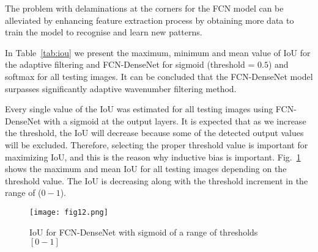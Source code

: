 The problem with delaminations at the corners for the FCN model can be alleviated by enhancing feature extraction process by obtaining more data to train the model to recognise and learn new patterns.

In Table~\ref{tab:iou} we present the maximum, minimum and mean value of IoU for the adaptive filtering and FCN-DenseNet for sigmoid (threshold = \(0.5\)) and softmax for all testing images.
It can be concluded that the FCN-DenseNet model surpasses significantly adaptive wavenumber filtering method. 
	\begin{table}
	 \renewcommand{\arraystretch}{1.3}
		\centering
		\caption{IoU for all models}
		\label{tab:iou}
	\end{table}
	
Every single value of the IoU was estimated for all testing images using FCN-DenseNet with a sigmoid at the output layers.
It is expected that as we increase the threshold, the IoU will decrease because some of the detected output values will be excluded.
Therefore, selecting the proper threshold value is important for maximizing IoU, and this is the reason why inductive bias is important. 
Fig.~\ref{fig:iou_fcn} shows the maximum and mean IoU for all testing images depending on the threshold value. 
The IoU is decreasing along with the threshold increment in the range of (\(0-1\)).
	\begin{figure}[!h] 
		\centering
		\texttt{[image: fig12.png]}
		\centering
		\caption{IoU for FCN-DenseNet with sigmoid of a range of thresholds \([0-1]\)} 
		\label{fig:iou_fcn}
	\end{figure}
	
